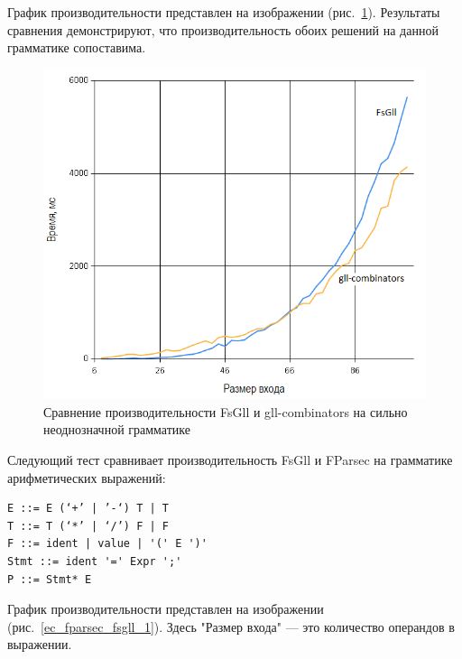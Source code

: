\documentclass[14pt]{matmex-diploma}
\begin{document}
График производительности представлен на изображении (рис.~\ref{nnn_scala_fsgll}).
Результаты сравнения демонстрируют, что производительность обоих решений на данной грамматике сопоставима. 

\begin{figure}[!h]
  \label{nnn_scala_fsgll}
  \centering
  \includegraphics[width=15cm]{pics/graph1.png}
  \caption{Сравнение производительности FsGll и gll-combinators на сильно неоднозначной грамматике}
\end{figure}
\FloatBarrier




Следующий тест сравнивает производительность  FsGll и FParsec на грамматике арифметических выражений:
\begin{lstlisting}
E ::= E (‘+’ | ’-‘) T | T
T ::= T (‘*’ | ‘/’) F | F
F ::= ident | value | '(' E ')'
Stmt ::= ident '=' Expr ';'
P ::= Stmt* E
\end{lstlisting}

График производительности представлен на изображении (рис.~\ref{ec_fparsec_fsgll_1}). 
Здесь "Размер входа" --- это количество операндов в выражении.
\end{document}
